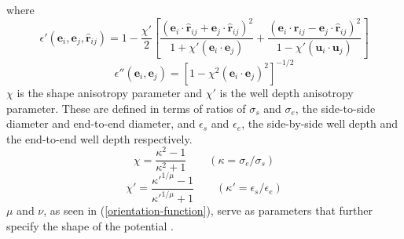 \documentclass[preprint, aps]{revtex4-1}
\begin{document}
where
	\begin{equation} \label{o-func1}
		\epsilon'(\mathbf{e}_i,\mathbf{e}_j,\mathbf{\hat{r}}_{ij}) 
		= 1 - \frac{\chi'}{2}
		\left[
			\frac{
				(\mathbf{e}_i \cdot \mathbf{\hat{r}}_{ij} 
				+ \mathbf{e}_j \cdot \mathbf{\hat{r}}_{ij})^2
			}
			{
				1+\chi'(\mathbf{e}_i \cdot \mathbf{e}_j)
			}
			+ \frac{
				(\mathbf{e}_i \cdot \mathbf{\hat{r}}_{ij} 
				- \mathbf{e}_j \cdot \mathbf{\hat{r}}_{ij})^2
				}
				{
					1-\chi'(\mathbf{u}_i \cdot \mathbf{u}_j)
				}
		\right]
	\end{equation}
	\begin{equation} \label{o-func2}	
		\epsilon''(\mathbf{e}_i,\mathbf{e}_j) 
		= \left[ 1 - \chi^2(\mathbf{e}_i \cdot \mathbf{e}_j)^2 \right]^{-1/2}	
	\end{equation}
$\chi$ is the shape anisotropy parameter and $\chi'$ is the well depth 
anisotropy parameter. These are defined in terms of ratios of $\sigma_s$ 
and $\sigma_e$, the side-to-side diameter and end-to-end diameter, and 
$\epsilon_s$ and $\epsilon_e$, the side-by-side well depth and the 
end-to-end well depth respectively.
	\begin{equation} \label{chi}
		\chi = \frac{\kappa^2 - 1}{\kappa^2 + 1} 
		\qquad (\kappa = \sigma_e / \sigma_s)
	\end{equation}
	\begin{equation} \label{chi-prime}	
		\chi' = \frac{\kappa'^{1/\mu} - 1}{\kappa'^{1/\mu} + 1} 
		\qquad (\kappa' = \epsilon_s / \epsilon_e)
	\end{equation}
$\mu$ and $\nu$, as seen in (\ref{orientation-function}), serve as parameters 
that further specify the shape of the potential \cite{luckhurst06}. 
\end{document}
